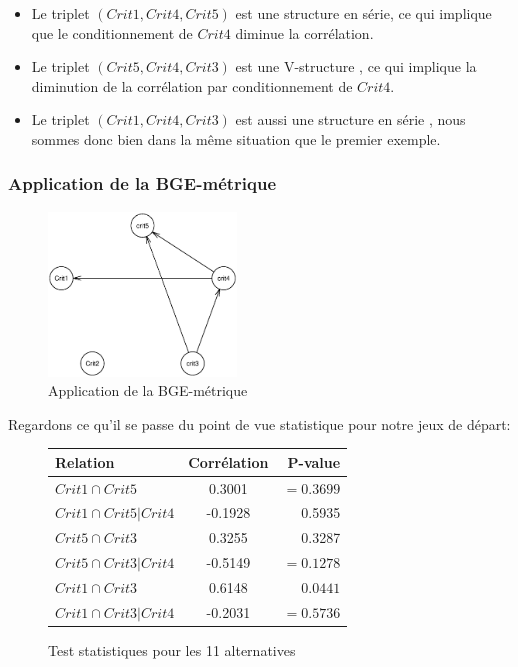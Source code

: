 \documentclass[a4paper]{article}
\begin{document}
\begin{appendices}
\begin{itemize}
\item Le triplet $(Crit1,Crit4,Crit5)$  est une structure en série, ce qui implique que le conditionnement de $Crit4$ diminue la corrélation.
\item Le triplet $(Crit5,Crit4,Crit3)$ est une V-structure , ce qui implique la diminution de la corrélation par conditionnement de $Crit4$.
\item Le triplet $(Crit1,Crit4,Crit3)$ est aussi une structure en série , nous sommes donc bien dans la même situation que le premier exemple.

\end{itemize}


\subsubsection{Application de la BGE-métrique}
\begin{figure}[H] 
    \center 
    \includegraphics[width=5cm]{GUITARE_GRAPHE_BGE.eps} 
    \caption{Application de la BGE-métrique } 
\end{figure} 

Regardons ce qu'il se passe  du point de vue statistique pour notre jeux de départ:

\begin{figure}[H]
\begin{center}
\begin{tabular}{|l|c|r|}
  \hline
  Relation & Corrélation & P-value \\
  \hline
$Crit1 \cap Crit5$&0.3001&$=0.3699 $\\
$Crit1 \cap Crit5 | Crit4$&-0.1928&0.5935 \\
$Crit5 \cap Crit3$&0.3255&0.3287 \\
$Crit5 \cap Crit3 |Crit4$&-0.5149&$=0.1278$\\
$Crit1 \cap Crit3$&0.6148&$0.0441$\\
$Crit1 \cap Crit3 |Crit4$&  -0.2031&$=0.5736$\\
\hline
\end{tabular}
\end{center}
\caption{Test statistiques pour les 11 alternatives }
\end{figure}


\end{appendices}
\end{document}

